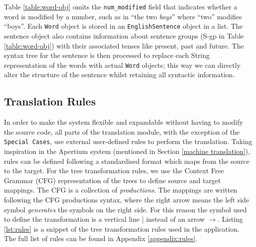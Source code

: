 \documentclass[12pt]{ociamthesis}  %
\begin{document}
Table \ref{table:word-obj} omits the \texttt{num\_modified} field that indicates whether a word is modified by a number, such as in ``the two \textit{boys}'' where ``two'' modifies ``boys''. Each \texttt{Word} object is stored in an \texttt{EnglishSentence} object in a list. The sentence object also contains information about sentence groups (S-gp in Table \ref{table:word-obj}) with their associated tenses like present, past and future. The syntax tree for the sentence is then processed to replace each String representation of the words with actual \texttt{Word} objects; this way we can directly alter the structure of the sentence whilst retaining all syntactic information.

\subsection{Translation Rules}
\label{rules}
In order to make the system flexible and expandable without having to modify the source code, all parts of the translation module, with the exception of the \texttt{Special Cases}, use external user-defined rules to perform the translation. Taking inspiration in the Apertium system (mentioned in Section \ref{machine translation}), rules can be defined following a standardised format which maps from the source to the target. For the tree transformation rules, we use the Context Free Grammar (CFG) representation of the trees to define source and target mappings. The CFG is a collection of \textit{productions}. The mappings are written following the CFG productions syntax, where the right arrow means the left side symbol \textit{generates} the symbols on the right side. For this reason the symbol used to define the transformation is a vertical line | instead of an arrow $\rightarrow$. Listing \ref{lst:rules} is a snippet of the tree transformation rules used in the application. The full list of rules can be found in Appendix \ref{appendix:rules}.
\end{document}
